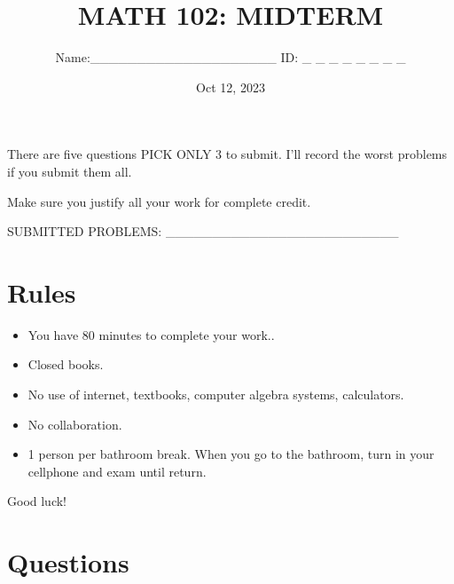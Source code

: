 \documentclass[12pt]{amsart}
\title{ MATH 102: MIDTERM }
\author{Name:\_\_\_\_\_\_\_\_\_\_\_\_\_\_\_\_\_\_\_\_ ID: \_  \_  \_   \_  \_  \_  \_  \_ 
}
\date{Oct 12, 2023}
\begin{document}
\maketitle


There are five questions PICK ONLY 3 to submit.
I'll record the worst problems if you submit them all.

Make sure you justify all your work for complete credit.

\vspace{1cm}

SUBMITTED PROBLEMS: \_\_\_\_\_\_\_\_\_\_\_\_\_\_\_\_\_\_\_\_\_\_\_\_\_

\vspace{3cm}
\section*{Rules}

\begin{itemize}[leftmargin=*]
	\item You have 80  minutes to complete your work..
	\item Closed books.
	\item No use of internet, textbooks, computer algebra systems, calculators.
	\item No collaboration.
	\item 1 person per bathroom break. When you go to the bathroom, turn in your cellphone and exam until return.
\end{itemize}

\begin{center}
	Good luck!
\end{center}

\newpage

\section*{Questions}
\end{document}

